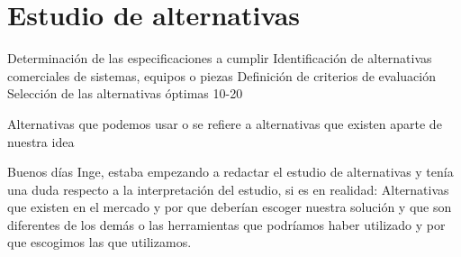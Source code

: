 \chapter{Estudio de alternativas}

Determinación de las especificaciones a cumplir
Identificación de alternativas comerciales de
sistemas, equipos o piezas
Definición de criterios de evaluación
Selección de las alternativas óptimas
10-20



Alternativas que podemos usar o se refiere a alternativas que existen aparte de nuestra idea

Buenos días Inge, estaba empezando a redactar el estudio de alternativas y tenía una duda respecto a la interpretación del estudio, si es en realidad:
Alternativas que existen en el mercado y por que deberían escoger nuestra solución y que son diferentes de los demás o las herramientas que podríamos haber utilizado y por que escogimos las que utilizamos.